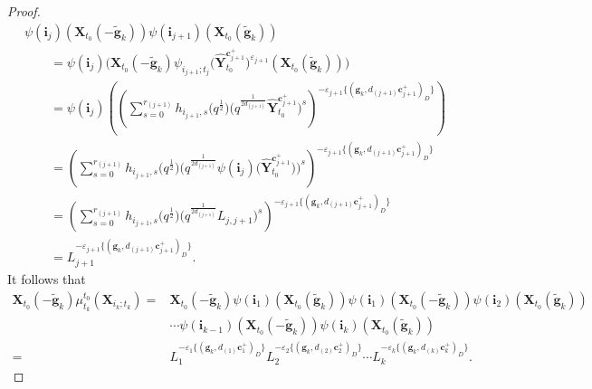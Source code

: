 \begin{proof}
\begin{gather*}
  \psi(\mathbf{i}_{j})(\mathbf{X}_{t_{0}}(-\mathbf{\tilde{g}}_{k}))\psi(\mathbf{i}_{j+1})(\mathbf{X}_{t_{0}}(\mathbf{\tilde{g}}_{k}))\\
  \qquad=\psi(\mathbf{i}_{j})\bigl(\mathbf{X}_{t_{0}}(-\mathbf{\tilde{g}}_{k})\psi_{i_{j+1};t_{j}}\bigl(\mathbf{\hat{Y}}_{t_0}^{\mathbf{c}_{j+1}^+}\bigr)^{\varepsilon_{j+1}}
  (\mathbf{X}_{t_{0}}(\mathbf{\tilde{g}}_{k}))\bigr)\\
 \qquad  =\psi(\mathbf{i}_{j})\left(\left(\sum\limits^{r_{(j+1)}}_{s=0}h_{i_{j+1},s}\bigl(q^{\frac{1}{2}}\bigr)
 \bigl(q^{\frac{1}{2d_{(j+1)}}}\mathbf{\hat{Y}}_{t_{0}}^{\mathbf{c}_{j+1}^{+}}\bigr)^{s}\right)
 ^{-\varepsilon_{j+1}\{(\mathbf{g}_{k},d_{(j+1)}\mathbf{c}_{j+1}^{+})_{D}\}}\right)\\
\qquad  =\left(\sum\limits^{r_{(j+1)}}_{s=0}h_{i_{j+1},s}\bigl(q^{\frac{1}{2}}\bigr)\bigl(q^{\frac{1}{2d_{(j+1)}}}\psi(\mathbf{i}_{j})\bigl(\mathbf{\hat{Y}}_{t_{0}}^{\mathbf{c}_{j+1}^{+}}\bigr)\bigr)^{s}\right)^{-\varepsilon_{j+1}\{(\mathbf{g}_{k},d_{(j+1)}\mathbf{c}_{j+1}^{+})_{D}\}}\\
\qquad  =\left(\sum\limits^{r_{(j+1)}}_{s=0}h_{i_{j+1},s}\bigl(q^{\frac{1}{2}}\bigr)\bigl(q^{\frac{1}{2d_{(j+1)}}}L_{j,j+1}\bigr)^{s}\right)^{-\varepsilon_{j+1}\{(\mathbf{g}_{k},d_{(j+1)}\mathbf{c}_{j+1}^{+})_{D}\}}\\
\qquad  =L_{j+1}^{-\varepsilon_{j+1}\{(\mathbf{g}_{k},d_{(j+1)}\mathbf{c}_{j+1}^{+})_{D}\}}.
 \end{gather*}
 It follows that
 \begin{align*}
 \mathbf{X}_{t_{0}}(-\mathbf{\tilde{g}}_{k})\mu_{t_{k}}^{t_{0}}(\mathbf{X}_{i_{k};t_{k}})
 ={}&\mathbf{X}_{t_{0}}(-\mathbf{\tilde{g}}_{k})\psi(\mathbf{i}_{1})(\mathbf{X}_{t_{0}}(\mathbf{\tilde{g}}_{k}))\psi(\mathbf{i}_{1})(\mathbf{X}_{t_{0}}(-\mathbf{\tilde{g}}_{k}))\psi(\mathbf{i}_{2})(\mathbf{X}_{t_{0}}(\mathbf{\tilde{g}}_{k}))\\
 &\cdots\psi(\mathbf{i}_{k-1})(\mathbf{X}_{t_{0}}(-\mathbf{\tilde{g}}_{k}))\psi(\mathbf{i}_{k})(\mathbf{X}_{t_{0}}(\mathbf{\tilde{g}}_{k}))\\
 ={}&L_{1}^{-\varepsilon_{1}\{(\mathbf{g}_{k},d_{(1)}\mathbf{c}_{1}^{+})_{D}\}}L_{2}^{-\varepsilon_{2}\{(\mathbf{g}_{k},d_{(2)}\mathbf{c}_{2}^{+})_{D}\}}\cdots L_{k}^{-\varepsilon_{k}\{(\mathbf{g}_{k},d_{(k)}\mathbf{c}_{k}^{+})_{D}\}}.\tag*{\qed}
 \end{align*}\renewcommand{\qed}{}
\end{proof}

